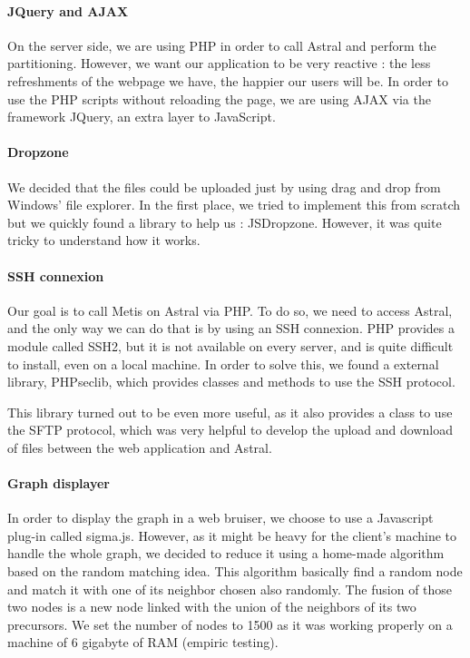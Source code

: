 \documentclass{cranfieldChart}
\begin{document}
\paragraph{JQuery and AJAX}
On the server side, we are using PHP in order to call Astral and perform the partitioning. However, we want our application to be very reactive : the less refreshments of the webpage we have, the happier our users will be. In order to use the PHP scripts without reloading the page, we are using AJAX via the framework JQuery, an extra layer to JavaScript.

\paragraph{Dropzone}
We decided that the files could be uploaded just by using drag and drop from Windows' file explorer. In the first place, we tried to implement this from scratch but we quickly found a library to help us : JSDropzone. However, it was quite tricky to understand how it works.

\paragraph{SSH connexion}
Our goal is to call Metis on Astral via PHP. To do so, we need to access Astral, and the only way we can do that is by using an SSH connexion. PHP provides a module called SSH2, but it is not available on every server, and is quite difficult to install, even on a local machine. In order to solve this, we found a external library, PHPseclib, which provides classes and methods to use the SSH protocol.

This library turned out to be even more useful, as it also provides a class to use the SFTP protocol, which was very helpful to develop the upload and download of files between the web application and Astral.

\paragraph{Graph displayer}
In order to display the graph in a web bruiser, we choose to use a Javascript plug-in called sigma.js. However, as it might be heavy for the client's machine to handle the whole graph, we decided to reduce it using a home-made algorithm based on the random matching idea. This algorithm basically find a random node and match it with one of its neighbor chosen also randomly. The fusion of those two nodes is a new node linked with the union of the neighbors of its two precursors.
We set the number of nodes to 1500 as it was working properly on a machine of 6 gigabyte of RAM (empiric testing).
\end{document}
